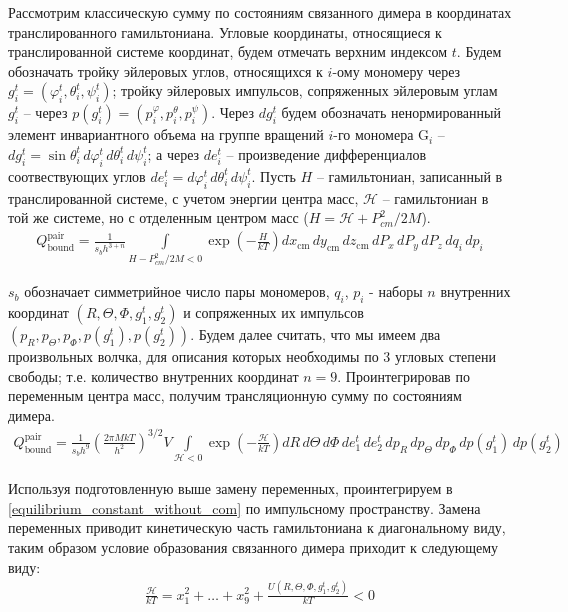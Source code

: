 \documentclass[14pt]{extarticle}
\newcommand{\lb}{\left(}
\newcommand{\rb}{\right)}
\newcommand{\mH}{\mathcal{H}}
\begin{document}
Рассмотрим классическую сумму по состояниям связанного димера в координатах транслированного гамильтониана. Угловые координаты, относящиеся к транслированной системе координат, будем отмечать верхним индексом $t$. Будем обозначать тройку эйлеровых углов, относящихся к $i$-ому мономеру через $g_i^t = \lb \varphi_i^t, \theta_i^t, \psi_i^t \rb$; тройку эйлеровых импульсов, сопряженных эйлеровым углам $g_i^t$ -- через $p(g_i^t) = \lb p_i^\varphi, p_i^\theta, p_i^\psi \rb$. Через $d g_i^t$ будем обозначать ненормированный элемент инвариантного объема на группе вращений $i$-го мономера G$_i$ -- $\displaystyle dg_i^t = \sin \theta_i^t \, d\varphi_i^t \, d\theta_i^t \, d\psi_i^t$; а через $de_i^t$ -- произведение дифференциалов соотвествующих углов $de_i^t = d\varphi_i^t \, d\theta_i^t \, d\psi_i^t$. Пусть $H$ -- гамильтониан, записанный в транслированной системе, с учетом энергии центра масс, $\mH$ -- гамильтониан в той же системе, но с отделенным центром масс ($H = \mH + P_{cm}^2/2M$). 
\begin{gather}
		Q_{\text{bound}}^{\text{pair}} = \frac{1}{s_b h^{3+n}} \int\limits_{H - P_{cm}^2 / 2 M < 0} \exp \lb - \frac{H}{k T} \rb d x_{\text{cm}} \, d y_{\text{cm}} \, d z_{\text{cm}} \, d P_x \, d P_y \, dP_z \, dq_i \, dp_i  
\end{gather}

$s_b$ обозначает симметрийное число пары мономеров, $q_i$, $p_i$ - наборы $n$ внутренних координат $(R, \Theta, \Phi, g_1^t, g_2^t)$ и сопряженных их импульсов $(p_R, p_\Theta, p_\Phi, p(g_1^t), p(g_2^t))$. Будем далее считать, что мы имеем два произвольных волчка, для описания которых необходимы по 3 угловых степени свободы; т.е. количество внутренних координат $n = 9$. Проинтегрировав по переменным центра масс, получим трансляционную сумму по состояниям димера. 
\begin{gather}
	Q_{\text{bound}}^{\text{pair}} = \frac{1}{s_b h^9} \lb \frac{2 \pi M k T}{h^2} \rb^{3/2} V \int\limits_{\mH < 0} \exp \lb -\frac{\mH}{kT} \rb dR \, d\Theta \, d\Phi \, de_1^t \, de_2^t \, dp_R \, dp_\Theta \, dp_\Phi \, dp(g_1^t) \, dp(g_2^t) \label{equilibrium_constant_without_com}  
\end{gather}

Используя подготовленную выше замену переменных, проинтегрируем в \eqref{equilibrium_constant_without_com} по импульсному пространству. Замена переменных приводит кинетическую часть гамильтониана к диагональному виду, таким образом условие образования связанного димера приходит к следующему виду:
\begin{gather}
	\frac{\mH}{k T} = x_1^2 + \ldots + x_9^2 + \frac{U(R, \Theta, \Phi, g_1^t, g_2^t)}{k T} < 0
\end{gather}
\end{document}
